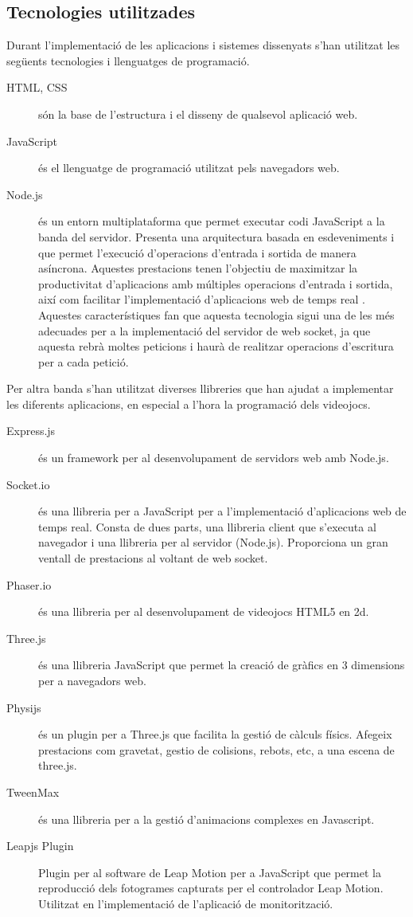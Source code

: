 \documentclass[12pt,a4paper,catalan]{article}
\begin{document}
	\subsection{Tecnologies utilitzades}
	Durant l'implementació de les aplicacions i sistemes dissenyats s'han utilitzat les següents tecnologies i llenguatges de programació.
	\begin{description}
		\item[HTML, CSS] són la base de l'estructura i el disseny de qualsevol aplicació web.
		\item[JavaScript] és el llenguatge de programació utilitzat pels navegadors web.
		\item[Node.js] és un entorn multiplataforma que permet executar codi JavaScript a la banda del servidor. Presenta una arquitectura basada en esdeveniments i que permet l'execució d'operacions d'entrada i sortida de manera asíncrona. Aquestes prestacions tenen l'objectiu de maximitzar la productivitat d'aplicacions amb múltiples operacions d'entrada i sortida, així com facilitar l'implementació d'aplicacions web de temps real \cite{nodejs}.\\
		Aquestes característiques fan que aquesta tecnologia sigui una de les més adecuades per a la implementació del servidor de web socket, ja que aquesta rebrà moltes peticions i haurà de realitzar operacions d'escritura per a cada petició.
	\end{description}
	Per altra banda s'han utilitzat diverses llibreries que han ajudat a implementar les diferents aplicacions, en especial a l'hora la programació dels videojocs.\\
	\begin{description}
		\item[Express.js] és un framework per al desenvolupament de servidors web amb Node.js.
		\item[Socket.io] és una llibreria per a JavaScript per a l'implementació d'aplicacions web de temps real. Consta de dues parts, una llibreria client que s'executa al navegador i una llibreria per al servidor (Node.js). Proporciona un gran ventall de prestacions al voltant de web socket.
		\item[Phaser.io] és una llibreria per al desenvolupament de videojocs HTML5 en 2d.
		\item[Three.js] és una llibreria JavaScript que permet la creació de gràfics en 3 dimensions per a navegadors web.
		\item[Physijs] és un plugin per a Three.js que facilita la gestió de càlculs físics. Afegeix prestacions com gravetat, gestio de colisions, rebots, etc, a una escena de three.js.
		\item[TweenMax] és una llibreria per a la gestió d'animacions complexes en Javascript.
		\item[Leapjs Plugin] Plugin per al software de Leap Motion per a JavaScript que permet la reproducció dels fotogrames capturats per el controlador Leap Motion. Utilitzat en l'implementació de l'aplicació de monitorització.
	\end{description}
\end{document}
